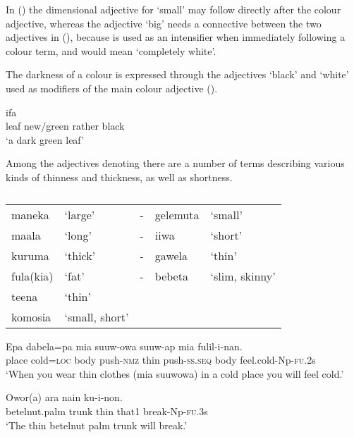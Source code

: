 In () the dimensional adjective for `small' may follow directly after the colour adjective, whereas the adjective  `big' needs a connective between the two adjectives in (), because  is used as an intensifier when immediately following a colour term, and  would mean `completely white'.

The darkness of a colour is expressed through the adjectives  `black' and  `white' used as modifiers of the main colour adjective ().

\ea%
\label{ex:x110}
\gll ifa    \\
leaf new/green rather black\\
\glt`a dark green leaf'
\z

Among the adjectives denoting  there are a number of terms describing various kinds of thinness and thickness, as well as shortness. 

\begin{table}
\caption{}
\label{} 
\begin{tabular}{llcll}
maneka &`large' &- &gelemuta &`small'\\
maala &`long' &- &iiwa &`short'\\
kuruma &`thick' &- &gawela &`thin'\\
fula(kia) &`fat' &- &bebeta &`slim, skinny'\\
teena &`thin'&&&\\
komosia &`small, short'&&&\\
\end{tabular}
\end{table}

\ea%
\label{ex:x1756}
\gll Epa dabela=pa mia suuw-owa  suuw-ap mia fulil-i-nan.\\
place cold=\textsc{loc} body push-\textsc{nmz} thin push-\textsc{ss}.\textsc{seq} body feel.cold-Np-\textsc{fu}.2s\\
\glt`When you wear thin clothes (mia suuwowa) in a cold place you will feel cold.' 
\z

\ea%
\label{ex:x76}
\gll Owor(a) ara   nain ku-i-non. \\
betelnut.palm trunk thin that1 break-Np-\textsc{fu}.3s\\
\glt`The thin betelnut palm trunk will break.'
\z

